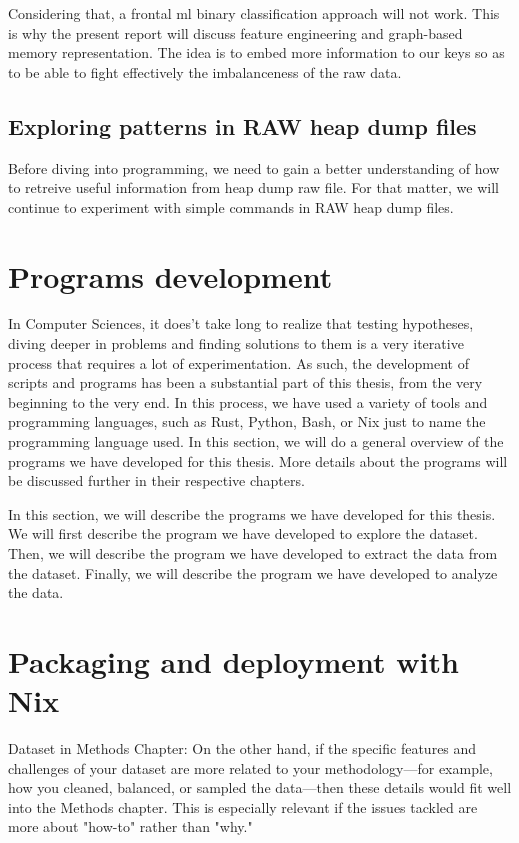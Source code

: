     Considering that, a frontal \acrshort{ml} binary classification approach will not work. This is why the present report will discuss feature engineering and graph-based memory representation. The idea is to embed more information to our keys so as to be able to fight effectively the imbalanceness of the raw data.

    \subsection{Exploring patterns in RAW heap dump files}
    Before diving into programming, we need to gain a better understanding of how to retreive useful information from heap dump raw file. For that matter, we will continue to experiment with simple commands in RAW heap dump files.


\section{Programs development}

In Computer Sciences, it does't take long to realize that testing hypotheses, diving deeper in problems and finding solutions to them is a very iterative process that requires a lot of experimentation. As such, the development of scripts and programs has been a substantial part of this thesis, from the very beginning to the very end. In this process, we have used a variety of tools and programming languages, such as Rust, Python, Bash, or Nix just to name the programming language used. In this section, we will do a general overview of the programs we have developed for this thesis. More details about the programs will be discussed further in their respective chapters.


In this section, we will describe the programs we have developed for this thesis. We will first describe the program we have developed to explore the dataset. Then, we will describe the program we have developed to extract the data from the dataset. Finally, we will describe the program we have developed to analyze the data.


\section{Packaging and deployment with Nix}


Dataset in Methods Chapter: On the other hand, if the specific features and challenges of your dataset are more related to your methodology—for example, how you cleaned, balanced, or sampled the data—then these details would fit well into the Methods chapter. This is especially relevant if the issues tackled are more about "how-to" rather than "why."

